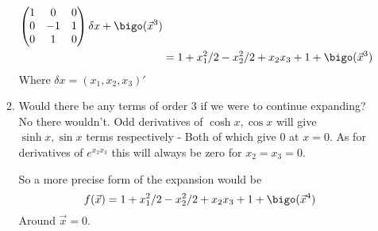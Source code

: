 \documentclass{X:/Documents/Coding/Latex/myassignment}
\begin{document}
\begin{enumerate}
\begin{enumerate}
\begin{align*}
\begin{pmatrix}
			1 &0 &0\\
			0 &-1 &1\\
			0 &1 & 0			
		\end{pmatrix} \delta x + \bigo(\vec x^3)\\
		&= 1 + x_1^2/2 - x_2^2/2 + x_2x_3 + 1 + \bigo(\vec x^3)
		\end{align*}
		Where $\delta x = (x_1,x_2,x_3)'$
		\item Would there be any terms of order $3$ if we were to continue expanding?
		No there wouldn't. Odd derivatives of $\cosh x, \cos x$ will give $\sinh x , \sin x$ terms respectively -  Both of which give $0$ at $x=0$. As for derivatives of $e^{x_2x_3}$ this will always be zero for $x_2=x_3=0$.

		So a more precise form of the expansion would be  
		\[f(\vec x) = 1 + x_1^2/2 - x_2^2/2 + x_2x_3 + 1 + \bigo(\vec x^4)\]
		Around $\vec x = 0$.

	\end{enumerate}
\end{enumerate}
\end{document}
